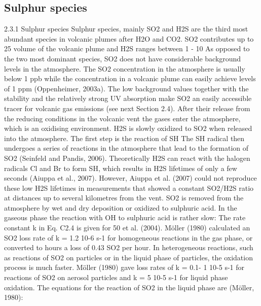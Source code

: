 \documentclass  [
  paper    = a4,
  BCOR     = 10mm,
  twoside,
  fontsize = 12pt,
  fleqn,
  toc      = bibnumbered,
  toc      = listofnumbered,
  numbers  = noendperiod,
  headings = normal,
  listof   = leveldown,
  version  = 3.03
]                                       {scrreprt}
\begin{document}
	\subsection{Sulphur species}
	2.3.1 Sulphur species
	Sulphur species, mainly SO2 and H2S are the third most abundant species in
	volcanic plumes after H2O and CO2. SO2 contributes up to 25%
	volume of the volcanic plume and H2S ranges between 1 - 10%
	As opposed to the two most dominant species, SO2 does not have considerable
	background levels in the atmosphere. The SO2 concentration in the atmosphere
	is usually below 1 ppb while the concentration in a volcanic plume can easily
	achieve levels of 1 ppm (Oppenheimer, 2003a). The low background values
	together with the stability and the relatively strong UV absorption make SO2
	an easily accessible tracer for volcanic gas emissions (see next Section 2.4).
	After their release from the reducing conditions in the volcanic vent the gases
	enter the atmosphere, which is an oxidising environment. H2S is slowly oxidized
	to SO2 when released into the atmosphere. The first step is the reaction of SH
	The SH radical then undergoes a series of reactions in the atmosphere that
	lead to the formation of SO2 (Seinfeld and Pandis, 2006). Theoretically H2S
	can react with the halogen radicals Cl and Br to form SH, which results in H2S
	lifetimes of only a few seconds (Aiuppa et al., 2007). However, Aiuppa et al.
	(2007) could not reproduce these low H2S lifetimes in measurements that showed
	a constant SO2/H2S ratio at distances up to several kilometres from the vent.
	SO2 is removed from the atmosphere by wet and dry deposition or oxidized to
	sulphuric acid. In the gaseous phase the reaction with OH to sulphuric acid is
	rather slow:
	The rate constant k in Eq. C2.4 is given for 50%
	et al. (2004). Möller (1980) calculated an SO2 loss rate of k = 1.2 10-6 s-1 for
	homogeneous reactions in the gas phase, or converted to hours a loss of 0.43%
	SO2 per hour. In heterogeneous reactions, such as reactions of SO2 on particles
	or in the liquid phase of particles, the oxidation process is much faster. Möller
	(1980) gave loss rates of k = 0.1- 1 10-5 s-1 for reactions of SO2 on aerosol
	particles and k = 5 10-5 s-1 for liquid phase oxidation. The equations for the reaction of SO2 in the liquid phase are (Möller, 1980):
\end{document}
